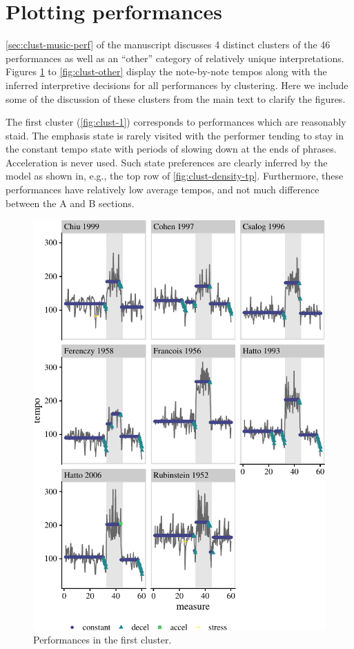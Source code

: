 \documentclass[aoas]{aoas/imsart}
\begin{document}
\hypertarget{plotting-performances}{%
\section{Plotting performances}\label{plotting-performances}}

\autoref{sec:clust-music-perf} of the manuscript discusses 4 distinct
clusters of the 46 performances as well as an ``other'' category of
relatively unique interpretations. Figures \ref{fig:clust-1} to
\ref{fig:clust-other} display the note-by-note tempos along with the
inferred interpretive decisions for all performances by clustering. Here
we include some of the discussion of these clusters from the main text
to clarify the figures.

The first cluster (\autoref{fig:clust-1}) corresponds to performances
which are reasonably staid. The emphasis state is rarely visited with
the performer tending to stay in the constant tempo state with periods
of slowing down at the ends of phrases. Acceleration is never used. Such
state preferences are clearly inferred by the model as shown in, e.g.,
the top row of \autoref{fig:clust-density-tp}. Furthermore, these
performances have relatively low average tempos, and not much difference
between the A and B sections.

\begin{figure}

{\centering \includegraphics{gfx/clust-1-1} 

}

\caption{Performances in the first cluster.}\label{fig:clust-1}
\end{figure}
\end{document}
